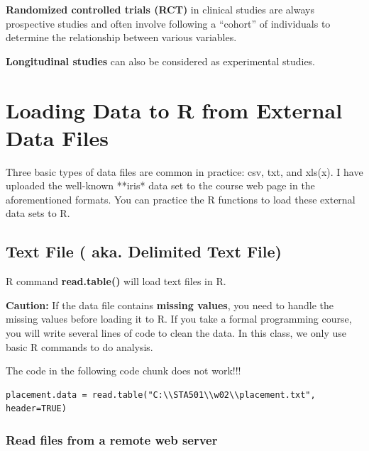 \documentclass[
]{book}
\begin{document}
\textbf{Randomized controlled trials (RCT)} in clinical studies are always prospective studies and often involve following a ``cohort'' of individuals to determine the relationship between various variables.

\textbf{Longitudinal studies} can also be considered as experimental studies.

\hypertarget{loading-data-to-r-from-external-data-files}{%
\section{Loading Data to R from External Data Files}\label{loading-data-to-r-from-external-data-files}}

Three basic types of data files are common in practice: csv, txt, and xls(x). I have uploaded the well-known **iris* data set to the course web page in the aforementioned formats. You can practice the R functions to load these external data sets to R.

\hypertarget{text-file-aka.-delimited-text-file}{%
\subsection{Text File ( aka. Delimited Text File)}\label{text-file-aka.-delimited-text-file}}

R command \textbf{read.table()} will load text files in R.

\textbf{Caution:} If the data file contains \textbf{missing values}, you need to handle the missing values before loading it to R. If you take a formal programming course, you will write several lines of code to clean the data. In this class, we only use basic R commands to do analysis.

The code in the following code chunk does not work!!!

\begin{verbatim}
placement.data = read.table("C:\\STA501\\w02\\placement.txt", header=TRUE) 
\end{verbatim}

\hypertarget{read-files-from-a-remote-web-server}{%
\subsubsection{Read files from a remote web server}\label{read-files-from-a-remote-web-server}}
\end{document}
